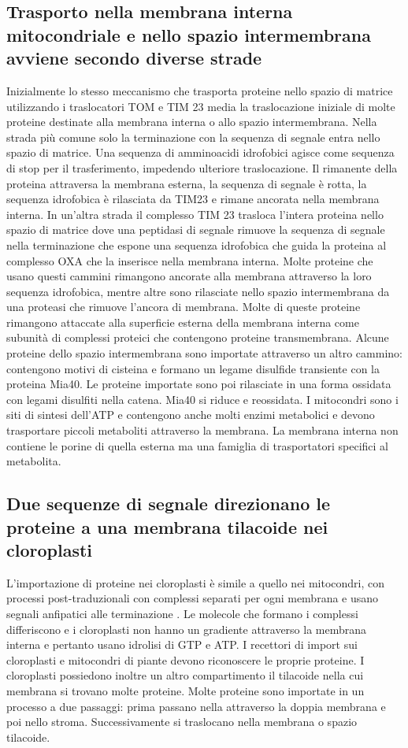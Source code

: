 \subsection{Trasporto nella membrana interna mitocondriale e nello spazio intermembrana avviene secondo diverse strade}
Inizialmente lo stesso meccanismo che trasporta proteine nello spazio di matrice utilizzando i traslocatori TOM e TIM 23 media la traslocazione iniziale di molte proteine destinate
alla membrana interna o allo spazio intermembrana. Nella strada pi\`u comune solo la terminazione  con la sequenza di segnale entra nello spazio di matrice. Una sequenza di
amminoacidi idrofobici agisce come sequenza di stop per il trasferimento, impedendo ulteriore traslocazione. Il rimanente della proteina attraversa la membrana esterna, la sequenza
di segnale \`e rotta, la sequenza idrofobica \`e rilasciata da TIM23 e rimane ancorata nella membrana interna. In un'altra strada il complesso TIM 23 trasloca l'intera proteina nello
spazio di matrice dove una peptidasi di segnale rimuove la sequenza di segnale nella terminazione  che espone una sequenza idrofobica che guida la proteina al complesso OXA che
la inserisce nella membrana interna. Molte proteine che usano questi cammini rimangono ancorate alla membrana attraverso la loro sequenza idrofobica, mentre altre sono rilasciate 
nello spazio intermembrana da una proteasi che rimuove l'ancora di membrana. Molte di queste proteine rimangono attaccate alla superficie esterna della membrana interna come subunit\`a
di complessi proteici che contengono proteine transmembrana. Alcune proteine dello spazio intermembrana sono importate attraverso un altro cammino: contengono motivi di cisteina e 
formano un legame disulfide transiente con la proteina Mia40. Le proteine importate sono poi rilasciate in una forma ossidata con legami disulfiti nella catena. Mia40 si riduce e 
reossidata. I mitocondri sono i siti di sintesi dell'ATP e contengono anche molti enzimi metabolici e devono trasportare piccoli metaboliti attraverso la membrana. La membrana interna
non contiene le porine di quella esterna ma una famiglia di trasportatori specifici al metabolita. 
\subsection{Due sequenze di segnale direzionano le proteine a una membrana tilacoide nei cloroplasti}
L'importazione di proteine nei cloroplasti \`e simile a quello nei mitocondri, con processi post-traduzionali con complessi separati per ogni membrana e usano segnali anfipatici alle
terminazione . Le molecole che formano i complessi differiscono e i cloroplasti non hanno un gradiente  attraverso la membrana interna e pertanto usano idrolisi di GTP e
ATP. I recettori di import sui cloroplasti e mitocondri di piante devono riconoscere le proprie proteine. I cloroplasti possiedono inoltre un altro compartimento il tilacoide nella cui
membrana si trovano molte proteine. Molte proteine sono importate in un processo a due passaggi: prima passano nella attraverso la doppia membrana e poi nello stroma. Successivamente
si traslocano nella membrana o spazio tilacoide. 
